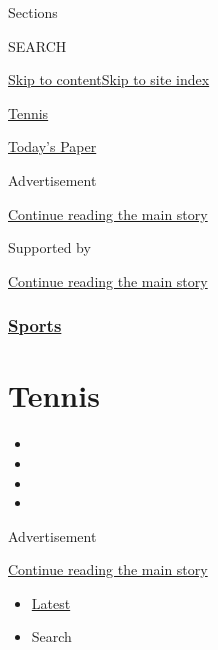 Sections

SEARCH

\protect\hyperlink{site-content}{Skip to
content}\protect\hyperlink{site-index}{Skip to site index}

\href{https://www.nytimes.com/section/sports/tennis}{Tennis}

\href{https://myaccount.nytimes.com/auth/login?response_type=cookie\&client_id=vi}{}

\href{https://www.nytimes.com/section/todayspaper}{Today's Paper}

Advertisement

\protect\hyperlink{after-top}{Continue reading the main story}

Supported by

\protect\hyperlink{after-sponsor}{Continue reading the main story}

\hypertarget{sports}{%
\subsubsection{\texorpdfstring{\href{/section/sports}{Sports}}{Sports}}\label{sports}}

\hypertarget{tennis}{%
\section{Tennis}\label{tennis}}

\begin{itemize}
\item
\item
\item
\item
\end{itemize}

Advertisement

\protect\hyperlink{after-subheader}{Continue reading the main story}

\begin{itemize}
\tightlist
\item
  \protect\hyperlink{stream-panel}{Latest}
\item
  Search
\end{itemize}

